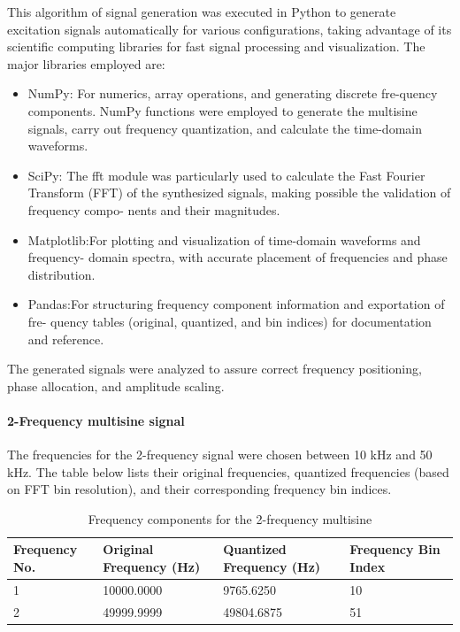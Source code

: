 This algorithm of signal generation was executed in Python to generate excitation signals automatically for various configurations, taking advantage of its scientific computing libraries for fast signal processing and visualization. The major libraries employed are:
\begin{itemize}
    \item NumPy: For numerics, array operations, and generating discrete fre-quency components. NumPy functions were employed to generate the multisine signals, carry out frequency quantization, and calculate the time-domain waveforms\cite{harris2020array}.

\item SciPy: The fft module was particularly used to calculate the Fast Fourier Transform
(FFT) of the synthesized signals, making possible the validation of frequency compo-
nents and their magnitudes\cite{virtanen2020scipy}.

\item Matplotlib:For plotting and visualization of time-domain waveforms and frequency-
domain spectra, with accurate placement of frequencies and phase distribution\cite{hunter2007matplotlib}.

\item Pandas:For structuring frequency component information and exportation of fre-
quency tables (original, quantized, and bin indices) for documentation and reference\cite{reback2020pandas}.
\end{itemize}
The generated signals were analyzed to assure
correct frequency positioning, phase allocation, and amplitude scaling.
\paragraph{2-Frequency multisine signal}  
The frequencies for the 2-frequency signal were chosen between 10 kHz and 50 kHz. The table below lists their original frequencies, quantized frequencies (based on FFT bin resolution), and their corresponding frequency bin indices.

\begin{table}[H]
    \centering
    \caption{Frequency components for the 2-frequency multisine}
    \label{tab:freq_2f}
    \begin{tabular}{|p{2cm}|p{4cm}|p{4cm}|p{3cm}|}
        \hline
        \textbf{Frequency No.} & \textbf{Original Frequency (Hz)} & \textbf{Quantized Frequency (Hz)} & \textbf{Frequency Bin Index} \\
        \hline
        1 & 10000.0000   & 9765.6250    & 10 \\
        \hline
        2 & 49999.9999  & 49804.6875  & 51 \\
        \hline
    \end{tabular}
\end{table}

